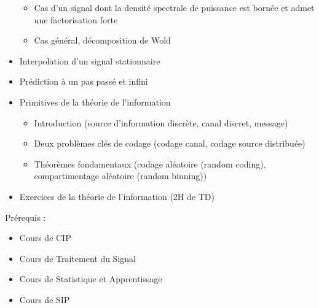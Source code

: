 \begin{itemize}
\begin{itemize}
        \item Cas d'un signal dont la densité spectrale de puissance est bornée et admet une factorisation forte
        \item Cas général, décomposition de Wold
    \end{itemize}
    \item Interpolation d'un signal stationnaire
    \item Prédiction à un pas passé et infini
    \item Primitives de la théorie de l'information
    \begin{itemize}
        \item Introduction (source d'information discrète, canal discret, message)
        \item Deux problèmes clés de codage (codage canal, codage source distribuée)
        \item Théorèmes fondamentaux (codage aléatoire (random coding), compartimentage aléatoire (random binning))
    \end{itemize}
    \item Exercices de la théorie de l'information (2H de TD) \newline
\end{itemize}
\newpage
\noindent Prérequis : \newline
\begin{itemize}
    \item Cours de CIP
    \item Cours de Traitement du Signal
    \item Cours de Statistique et Apprentissage
    \item Cours de SIP
\end{itemize}